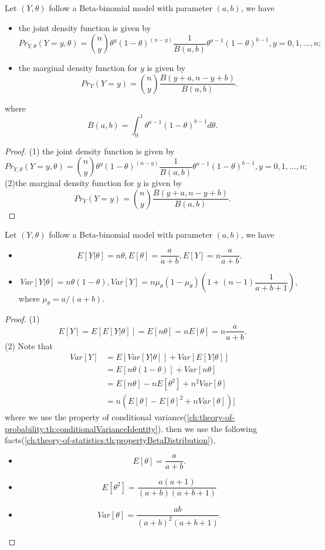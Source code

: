 \begin{refsection}
\begin{lemma}
Let $(Y,\theta)$ follow  a Beta-binomial model with parameter $(a,b)$, we have
\begin{itemize}
	\item the joint density function is given by
	$$Pr_{Y, \theta}(Y = y, \theta) = \binom{n}{y} \theta^y(1-\theta)^{(n-y)}\frac{1}{B(a,b)}\theta^{a-1}(1-\theta)^{b-1}, y=0,1,...,n;$$
	\item the marginal density function for $y$ is given by
	$$Pr_Y(Y=y)=\binom{n}{y} \frac{B(y+a,n-y+b)}{B(a,b)}.$$
\end{itemize}	
where $$B(a,b) = \int_0^1 \theta^{a-1}(1-\theta)^{b-1} d\theta.$$
\end{lemma}
\begin{proof}
(1) the joint density function is given by
$$Pr_{Y, \theta}(Y = y, \theta) = \binom{n}{y} \theta^y(1-\theta)^{(n-y)}\frac{1}{B(a,b)}\theta^{a-1}(1-\theta)^{b-1}, y=0,1,...,n;$$
(2)the marginal density function for $y$ is given by
$$Pr_Y(Y=y)=\binom{n}{y} \frac{B(y+a,n-y+b)}{B(a,b)}.$$	
\end{proof}





\begin{lemma}\label{ch:statistical-learning:th:BasicStatisticalPropertiesOfBetaBinomialModel}
Let $(Y,\theta)$ follow a Beta-binomial model with parameter $(a,b)$, we have
\begin{itemize}
	\item $$E[Y|\theta] = n\theta, E[\theta] = \frac{a}{a+b}, E[Y] = n\frac{a}{a+b}.$$
	\item $$Var[Y|\theta] = n\theta(1-\theta), Var[Y] = n\mu_{\theta}(1-\mu_\theta)(1 + (n-1)\frac{1}{a+b+1}),$$
	where $\mu_\theta = a/(a+b)$.
\end{itemize}	
\end{lemma}
\begin{proof}
(1) $$E[Y] = E[E[Y|\theta]] = E[n\theta] = nE[\theta] = n\frac{a}{a+b}.$$
(2) Note that 
\begin{align*}
Var[Y] &= E[Var[Y|\theta]] + Var[E[Y|\theta]] \\
&= E[n\theta(1-\theta)] + Var[n\theta] \\
&= E[n\theta] - nE[\theta^2] + n^2 Var[\theta] \\
&= n(E[\theta] - E[\theta]^2 + nVar[\theta]) ]
\end{align*}
where we use the property of conditional variance(\autoref{ch:theory-of-probability:th:conditionalVarianceIdentity}).
then we use the following facts(\autoref{ch:theory-of-statistics:th:propertyBetaDistribution}),
\begin{itemize}
	\item $$E[\theta] = \frac{a}{a+b}.$$
	\item $$E[\theta^2] = \frac{a(a+1)}{(a+b)(a+b+1)}$$
	\item $$Var[\theta] = \frac{ab}{(a+b)^2(a+b+1)}.$$
\end{itemize}
\end{proof}



\end{refsection}
